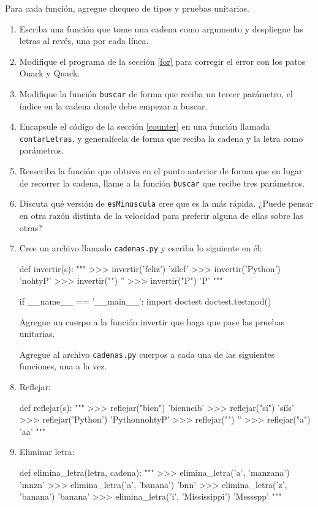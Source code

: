Para cada función, agregue chequeo de tipos y pruebas unitarias.
\begin{enumerate}
\item Escriba una función que tome una cadena como argumento y despliegue
las letras al revés, una por cada línea.
\item Modifique el programa de la sección \ref{for} para corregir el error
con los patos Ouack y Quack.
\item Modifique la función \texttt{buscar} de forma que reciba un tercer
parámetro, el índice en la cadena donde debe empezar a buscar.
\item Encapsule el código de la sección \ref{counter} en una función llamada
\texttt{contarLetras}, y generalícela de forma que reciba la cadena
y la letra como parámetros.
\item Reescriba la función que obtuvo en el punto anterior de forma que
en lugar de recorrer la cadena, llame a la función \texttt{buscar}
que recibe tres parámetros.
\item Discuta qué versión de \texttt{esMinuscula} cree que es la más rápida.
¿Puede pensar en otra razón distinta de la velocidad para preferir
alguna de ellas sobre las otras?
\item Cree un archivo llamado \verb+cadenas.py+ y escriba lo siguiente
en él:

\begin{pythoncode}
  def invertir(s):
    """
      >>> invertir('feliz')
      'zilef'
      >>> invertir('Python')
      'nohtyP'
      >>> invertir("")
      ''
      >>> invertir("P")
      'P'
    """

  if __name__ == '__main__':
    import doctest
    doctest.testmod()
\end{pythoncode}
 Agregue un cuerpo a la función invertir que haga que pase las pruebas
unitarias.

Agregue al archivo \verb+cadenas.py+ cuerpos a cada una de las siguientes
funciones, una a la vez.
\item Reflejar:
\begin{pythoncode}
  def reflejar(s):
    """
      >>> reflejar("bien")
      'bienneib'
      >>> reflejar("sí")
      'síís'
      >>> reflejar('Python')
      'PythonnohtyP'
      >>> reflejar("")
      ''
      >>> reflejar("a")
      'aa'
    """
\end{pythoncode}
\item Eliminar letra:
\begin{pythoncode}
  def elimina_letra(letra, cadena):
    """
      >>> elimina_letra('a', 'manzana')
      'mnzn'
      >>> elimina_letra('a', 'banana')
      'bnn'
      >>> elimina_letra('z', 'banana')
      'banana'
      >>> elimina_letra('i', 'Mississippi')
      'Msssspp'
    """
\end{pythoncode}


\end{enumerate}
